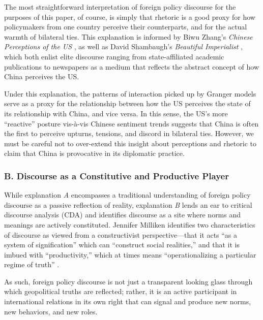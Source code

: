 \documentclass[12pt,letterpaper]{article}
\begin{document}
The most straightforward interpretation of foreign policy discourse for the purposes of this paper, of course, is simply that rhetoric is a good proxy for how policymakers from one country perceive their counterparts, and for the actual warmth of bilateral ties. This explanation is informed by Biwu Zhang's \emph{Chinese Perceptions of the US} \autocite*{zhang2011}, as well as David Shambaugh's \emph{Beautiful Imperialist} \autocite*{shambaugh1991}, which both enlist elite discourse ranging from state-affiliated academic publications to newspapers as a medium that reflects the abstract concept of how China perceives the US.

Under this explanation, the patterns of interaction picked up by Granger models serve as a proxy for the relationship between how the US perceives the state of its relationship with China, and vice versa. In this sense, the US's more ``reactive'' posture vis-à-vis Chinese sentiment trends suggests that China is often the first to perceive upturns, tensions, and discord in bilateral ties. However, we must be careful not to over-extend this insight about perceptions and rhetoric to claim that China is provocative in its diplomatic practice.

\subsubsection*{B. Discourse as a Constitutive and Productive Player}

While explanation \emph{A} encompasses a traditional understanding of foreign policy discourse as a passive reflection of reality, explanation \emph{B} lends an ear to critical discourse analysis (CDA) and identifies discourse as a site where norms and meanings are actively constituted. Jennifer Milliken identifies two characteristics of discourse as viewed from a constructivist perspective---that it acts ``as a system of signification'' which can ``construct social realities,'' and that it is imbued with ``productivity,'' which at times means ``operationalizing a particular regime of truth'' \autocite[229]{milliken1999}.

As such, foreign policy discourse is not just a transparent looking glass through which geopolitical truths are reflected; rather, it is an active participant in international relations in its own right that can signal and produce new norms, new behaviors, and new roles.
\end{document}
